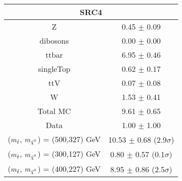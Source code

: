 \begin{tabular}{c|c}
\hline\hline
\multicolumn{2}{c}{\bf SRC4 } \\ \hline 
Z & 0.45 $\pm$ 0.09 \\
dibosons & 0.00 $\pm$ 0.00 \\
ttbar & 6.95 $\pm$ 0.46 \\
singleTop & 0.62 $\pm$ 0.17 \\
ttV & 0.07 $\pm$ 0.08 \\
W & 1.53 $\pm$ 0.41 \\
\hline
Total MC & 9.61 $\pm$ 0.65 \\
Data & 1.00 $\pm$ 1.00 \\
\hline
 ($m_{\tilde{t}}$, $\mLSP$) = (500,327) GeV & 10.53 $\pm$ 0.68 (2.9$\sigma$) \\
\hline
 ($m_{\tilde{t}}$, $\mLSP$) = (300,127) GeV & 0.80 $\pm$ 0.57 (0.1$\sigma$) \\
\hline
 ($m_{\tilde{t}}$, $\mLSP$) = (400,227) GeV & 8.95 $\pm$ 0.86 (2.5$\sigma$) \\
\hline\hline
\end{tabular}
